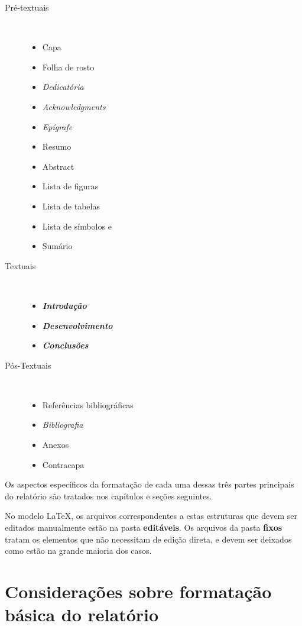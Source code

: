 \begin{description}
	\item [Pré-textuais] \

	\begin{itemize}
		\item Capa
		\item Folha de rosto
		\item \textit{Dedicatória}
		\item \textit{Acknowledgments}
		\item \textit{Epígrafe}
		\item Resumo
		\item Abstract
		\item Lista de figuras
		\item Lista de tabelas
		\item Lista de símbolos e
		\item Sumário
	\end{itemize}

	\item [Textuais] \

	\begin{itemize}
		\item \textbf{\textit{Introdução}}
		\item \textbf{\textit{Desenvolvimento}}
		\item \textbf{\textit{Conclusões}}
	\end{itemize}

	\item [Pós-Textuais] \
	
	\begin{itemize}
		\item Referências bibliográficas
		\item \textit{Bibliografia}
		\item Anexos
		\item Contracapa
	\end{itemize}
\end{description}

Os aspectos específicos da formatação de cada uma dessas três partes 
principais do relatório são tratados nos capítulos e seções seguintes.

No modelo \LaTeX, os arquivos correspondentes a estas estruturas que devem
ser editados manualmente estão na pasta \textbf{editáveis}. Os arquivos
da pasta \textbf{fixos} tratam os elementos que não necessitam de 
edição direta, e devem ser deixados como estão na grande maioria dos casos.

\section{Considerações sobre formatação básica do relatório}

